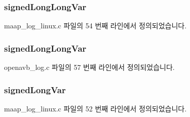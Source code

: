 \subsubsection[{\texorpdfstring{signed\+Long\+Long\+Var}{signedLongLongVar}}]{ signed\+Long\+Long\+Var}\hypertarget{structlog__rt__queue__item__t_a54d6e1f6bfe85ec7387103c044c87479}{}\label{structlog__rt__queue__item__t_a54d6e1f6bfe85ec7387103c044c87479}


maap\+\_\+log\+\_\+linux.\+c 파일의 54 번째 라인에서 정의되었습니다.

\subsubsection[{\texorpdfstring{signed\+Long\+Long\+Var}{signedLongLongVar}}]{ signed\+Long\+Long\+Var}\hypertarget{structlog__rt__queue__item__t_aeb5fb95fcffa5ba2f3b113eee40395b8}{}\label{structlog__rt__queue__item__t_aeb5fb95fcffa5ba2f3b113eee40395b8}


openavb\+\_\+log.\+c 파일의 57 번째 라인에서 정의되었습니다.

\subsubsection[{\texorpdfstring{signed\+Long\+Var}{signedLongVar}}]{ signed\+Long\+Var}\hypertarget{structlog__rt__queue__item__t_aa12bde1623a54d11dedc033ffbead487}{}\label{structlog__rt__queue__item__t_aa12bde1623a54d11dedc033ffbead487}


maap\+\_\+log\+\_\+linux.\+c 파일의 52 번째 라인에서 정의되었습니다.

